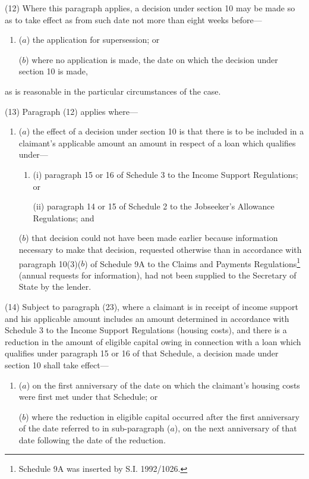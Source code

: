 \documentclass[12pt,a4paper]{article}
\begin{document}
(12) Where this paragraph applies, a decision under section 10 may be made so as to take effect as from such date not more than eight weeks before—
\begin{enumerate}\item[]
($a$) the application for supersession; or

($b$) where no application is made, the date on which the decision under section 10 is made,
\end{enumerate}
as is reasonable in the particular circumstances of the case.

(13) Paragraph (12) applies where—
\begin{enumerate}\item[]
($a$) the effect of a decision under section 10 is that there is to be included in a claimant’s applicable amount an amount in respect of a loan which qualifies under—
\begin{enumerate}\item[]
(i) paragraph 15 or 16 of Schedule 3 to the Income Support Regulations; or

(ii) paragraph 14 or 15 of Schedule 2 to the Jobseeker’s Allowance Regulations; and
\end{enumerate}

($b$) that decision could not have been made earlier because information necessary to make that decision, requested otherwise than in accordance with paragraph 10(3)($b$) of Schedule 9A to the Claims and Payments Regulations\footnote{\frenchspacing Schedule 9A was inserted by S.I. 1992/1026.} (annual requests for information), had not been supplied to the Secretary of State by the lender.
\end{enumerate}

(14) Subject to paragraph (23), where a claimant is in receipt of income support and his applicable amount includes an amount determined in accordance with Schedule 3 to the Income Support Regulations (housing costs), and there is a reduction in the amount of eligible capital owing in connection with a loan which qualifies under paragraph 15 or 16 of that Schedule, a decision made under section 10 shall take effect—
\begin{enumerate}\item[]
($a$) on the first anniversary of the date on which the claimant’s housing costs were first met under that Schedule; or

($b$) where the reduction in eligible capital occurred after the first anniversary of the date referred to in sub-paragraph ($a$), on the next anniversary of that date following the date of the reduction.
\end{enumerate}
\end{document}
